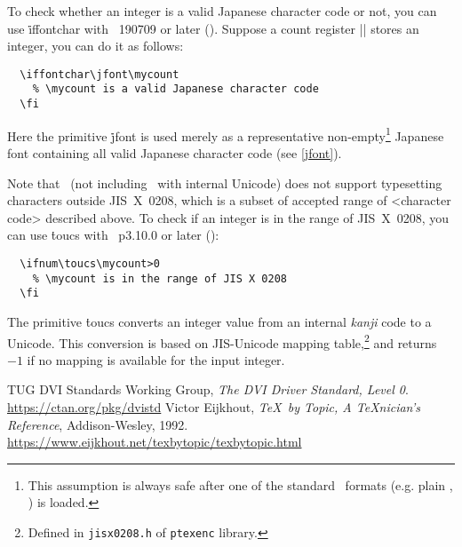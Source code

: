\documentclass[a4paper,11pt,dvipdfmx]{article}
\def\code#1{\texttt{#1}}
\def\Foreign#1{\textit{#1}}
\begin{document}
To check whether an integer is a valid Japanese character code or not,
you can use \.{iffontchar} with \epTeX~190709 or later ().
Suppose a count register |\mycount| stores an integer, you can do it as follows:
\begin{verbatim}
  \iffontchar\jfont\mycount
    % \mycount is a valid Japanese character code
  \fi
\end{verbatim}
Here the primitive \.{jfont} is used merely as
a representative non-empty\footnote{This assumption is always safe after
one of the standard \pTeX\ formats (e.g. plain \pTeX, \pLaTeX) is loaded.}
Japanese font containing all valid Japanese character code (see \ref{jfont}).

Note that \pTeX\ (not including \upTeX\ with internal Unicode) does not
support typesetting characters outside JIS~X~0208,
which is a subset of accepted range of <character code> described above.
To check if an integer is in the range of JIS~X~0208,
you can use \.{toucs} with \pTeX~p3.10.0 or later ():
\begin{verbatim}
  \ifnum\toucs\mycount>0
    % \mycount is in the range of JIS X 0208
  \fi
\end{verbatim}
The primitive \.{toucs} converts an integer value
from an internal \Foreign{kanji} code to a Unicode.
This conversion is based on JIS-Unicode mapping table,\footnote{Defined in
\code{jisx0208.h} of \code{ptexenc} library.} and returns $-1$
if no mapping is available for the input integer.


\newpage

\begin{thebibliography}{99}
  TUG DVI Standards Working Group,
  \textit{The DVI Driver Standard, Level 0}.\\
  \url{https://ctan.org/pkg/dvistd}
  Victor Eijkhout, \textit{\TeX\ by Topic, A \TeX nician's Reference},
  Addison-Wesley, 1992.\\
  \url{https://www.eijkhout.net/texbytopic/texbytopic.html}
\end{thebibliography}

\newpage
\printindex
\end{document}
